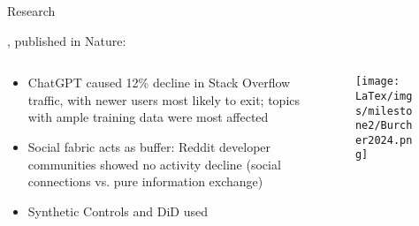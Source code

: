 \documentclass{beamer}
\begin{document}
    \begin{frame}{Research}
        \begin{center}
            \textbf{\textcite{burtch_consequences_2024}}, published in Nature:
        \end{center}
        \begin{columns}[c]
            \begin{column}{0.55\textwidth}
                \begin{itemize}
                    \item ChatGPT caused 12\% decline in Stack Overflow traffic, with newer users most likely to exit; topics with ample training data were most affected
                    \item Social fabric acts as buffer: Reddit developer communities showed no activity decline (social connections vs. pure information exchange)
                    \item Synthetic Controls and DiD used
                \end{itemize}
            \end{column}
            \begin{column}{0.4\textwidth}
                \begin{figure}
                    \centering
                    \texttt{[image: LaTex/imgs/milestone2/Burcher2024.png]}
                    \caption{\textcite{burtch_consequences_2024}}
                    \label{fig:burcher2024}
                \end{figure}
            \end{column}
        \end{columns}
    \end{frame}
\end{document}
